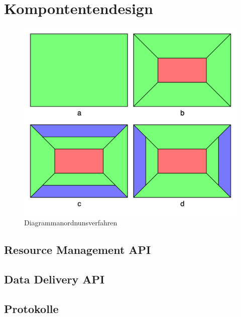 \chapter{Kompontentendesign}
\label{chap:komponentendesign}



\begin{figure}
    \label{figure:diagrammanordnungsverfahren}
    \begin{center}
    \includegraphics[scale=0.2]{img/abbildungen/Diagrammanordnunsverfahren}
    \end{center}
    \caption{Diagrammanordnunsverfahren}
\end{figure}

\section{Resource Management API}
\label{sec:resourcemanagementapi}

\section{Data Delivery API}
\label{sec:datadeliveryapi}

\section{Protokolle}
\label{sec:protokolle}
